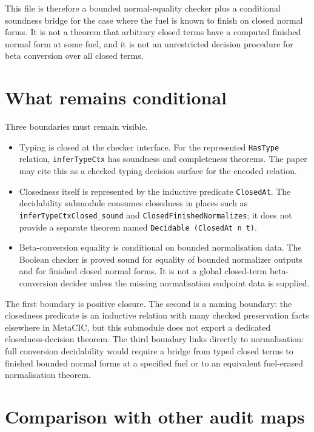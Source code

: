 This file is therefore a bounded normal-equality checker plus a conditional
soundness bridge for the case where the fuel is known to finish on closed
normal forms. It is not a theorem that arbitrary closed terms have a computed
finished normal form at some fuel, and it is not an unrestricted decision
procedure for beta conversion over all closed terms.

\section{What remains conditional}
\label{sec:metacic-decidable-audit-map-conditional}

Three boundaries must remain visible.

\begin{itemize}
\item Typing is closed at the checker interface. For the represented
  \texttt{HasType} relation, \texttt{inferTypeCtx} has soundness and
  completeness theorems. The paper may cite this as a checked typing
  decision surface for the encoded relation.
\item Closedness itself is represented by the inductive predicate
  \texttt{ClosedAt}. The decidability submodule consumes closedness in places
  such as \texttt{inferTypeCtxClosed\_sound} and
  \texttt{ClosedFinishedNormalizes}; it does not provide a separate theorem
  named \texttt{Decidable (ClosedAt n t)}.
\item Beta-conversion equality is conditional on bounded normalisation data.
  The Boolean checker is proved sound for equality of bounded normalizer
  outputs and for finished closed normal forms. It is not a global
  closed-term beta-conversion decider unless the missing normalisation
  endpoint data is supplied.
\end{itemize}

The first boundary is positive closure. The second is a naming boundary: the
closedness predicate is an inductive relation with many checked preservation
facts elsewhere in MetaCIC, but this submodule does not export a dedicated
closedness-decision theorem. The third boundary links directly to
normalisation: full conversion decidability would require a bridge from typed
closed terms to finished bounded normal forms at a specified fuel or to an
equivalent fuel-erased normalisation theorem.

\section{Comparison with other audit maps}
\label{sec:metacic-decidable-audit-map-comparison}

